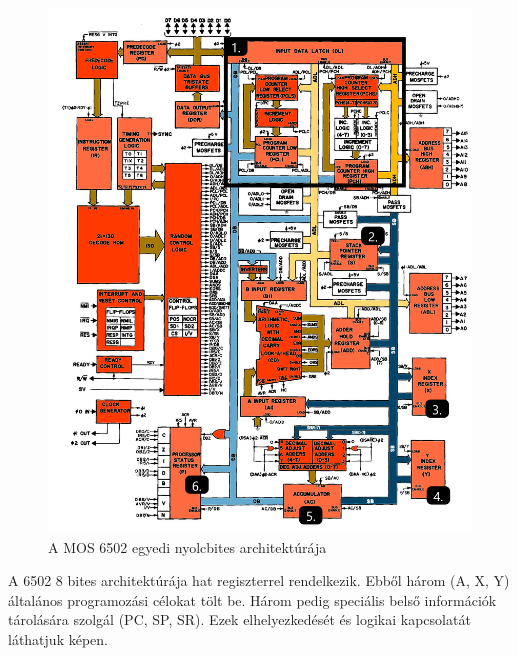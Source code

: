 	\begin{figure}[H]
	\centering
	\includegraphics[width=150mm, keepaspectratio]{figures/6502-blokk-diagram-pined}
	\caption{A MOS 6502 egyedi nyolcbites architektúrája}
	\label{fig:6502-Blokk-diagram}
	\end{figure}

	A 6502 8 bites architektúrája hat regiszterrel rendelkezik. Ebből három (A, X, Y) általános programozási célokat tölt be. Három pedig speciális belső információk tárolására szolgál (PC, SP, SR). Ezek elhelyezkedését és logikai kapcsolatát láthatjuk  képen.
	
